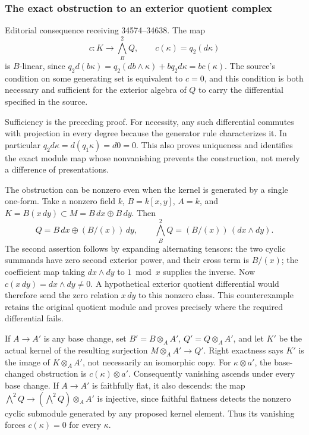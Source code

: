 \subsubsection{The exact obstruction to an exterior quotient complex}\label{the-exact-obstruction-to-an-exterior-quotient-complex}

Editorial consequence receiving 34574--34638. The map \[
c:K\longrightarrow\bigwedge_B^2Q,\qquad c(\kappa)=q_2(d\kappa)
\] is \(B\)-linear, since \(q_2d(b\kappa)=q_2(db\wedge\kappa)+bq_2d\kappa=bc(\kappa)\). The source's condition on some generating set is equivalent to \(c=0\), and this condition is both necessary and sufficient for the exterior algebra of \(Q\) to carry the differential specified in the source.

Sufficiency is the preceding proof. For necessity, any such differential commutes with projection in every degree because the generator rule characterizes it. In particular \(q_2d\kappa=d(q_1\kappa)=d0=0\). This also proves uniqueness and identifies the exact module map whose nonvanishing prevents the construction, not merely a difference of presentations.

The obstruction can be nonzero even when the kernel is generated by a single one-form. Take a nonzero field \(k\), \(B=k[x,y]\), \(A=k\), and \(K=B(x\,dy)\subset M=B\,dx\oplus B\,dy\). Then \[
Q=B\,dx\oplus(B/(x))\,dy,
\qquad\bigwedge^2_BQ=(B/(x))\,(dx\wedge dy).
\] The second assertion follows by expanding alternating tensors: the two cyclic summands have zero second exterior power, and their cross term is \(B/(x)\); the coefficient map taking \(dx\wedge dy\) to \(1\bmod x\) supplies the inverse. Now \(c(x\,dy)=dx\wedge dy\ne0\). A hypothetical exterior quotient differential would therefore send the zero relation \(x\,dy\) to this nonzero class. This counterexample retains the original quotient module and proves precisely where the required differential fails.

If \(A\to A'\) is any base change, set \(B'=B\otimes_A A'\), \(Q'=Q\otimes_A A'\), and let \(K'\) be the actual kernel of the resulting surjection \(M\otimes_A A'\to Q'\). Right exactness says \(K'\) is the image of \(K\otimes_A A'\), not necessarily an isomorphic copy. For \(\kappa\otimes a'\), the base-changed obstruction is \(c(\kappa)\otimes a'\). Consequently vanishing ascends under every base change. If \(A\to A'\) is faithfully flat, it also descends: the map \(\bigwedge^2Q\to(\bigwedge^2Q)\otimes_A A'\) is injective, since faithful flatness detects the nonzero cyclic submodule generated by any proposed kernel element. Thus its vanishing forces \(c(\kappa)=0\) for every \(\kappa\).

